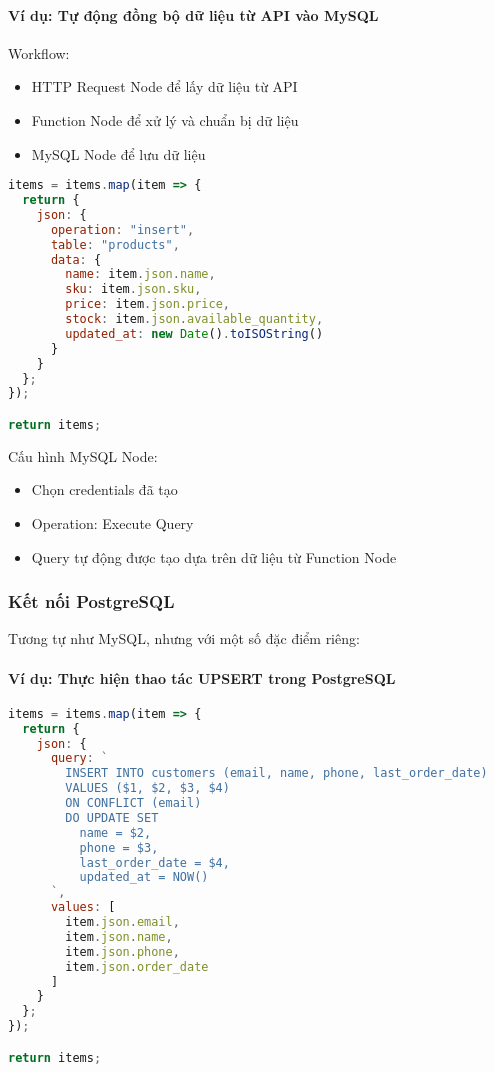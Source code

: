 \paragraph{Ví dụ: Tự động đồng bộ dữ liệu từ API vào MySQL}

Workflow:
\begin{itemize}
    \item HTTP Request Node để lấy dữ liệu từ API
    \item Function Node để xử lý và chuẩn bị dữ liệu
    \item MySQL Node để lưu dữ liệu
\end{itemize}

\begin{lstlisting}[language=JavaScript]
items = items.map(item => {
  return {
    json: {
      operation: "insert",
      table: "products",
      data: {
        name: item.json.name,
        sku: item.json.sku,
        price: item.json.price,
        stock: item.json.available_quantity,
        updated_at: new Date().toISOString()
      }
    }
  };
});

return items;
\end{lstlisting}

Cấu hình MySQL Node:
\begin{itemize}
    \item Chọn credentials đã tạo
    \item Operation: Execute Query
    \item Query tự động được tạo dựa trên dữ liệu từ Function Node
\end{itemize}

\subsubsection{Kết nối PostgreSQL}

Tương tự như MySQL, nhưng với một số đặc điểm riêng:

\paragraph{Ví dụ: Thực hiện thao tác UPSERT trong PostgreSQL}

\begin{lstlisting}[language=JavaScript]
items = items.map(item => {
  return {
    json: {
      query: `
        INSERT INTO customers (email, name, phone, last_order_date)
        VALUES ($1, $2, $3, $4)
        ON CONFLICT (email) 
        DO UPDATE SET 
          name = $2,
          phone = $3,
          last_order_date = $4,
          updated_at = NOW()
      `,
      values: [
        item.json.email,
        item.json.name,
        item.json.phone,
        item.json.order_date
      ]
    }
  };
});

return items;
\end{lstlisting}

